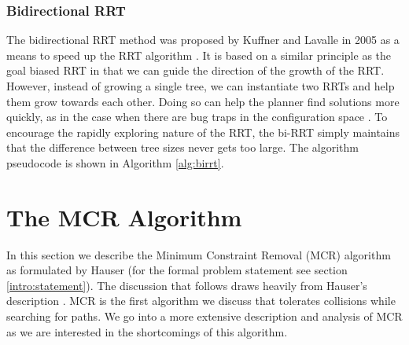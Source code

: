 \subsubsection{Bidirectional RRT} \label{planning:birrt}
The bidirectional RRT method was proposed by Kuffner and Lavalle in 2005 as a means to speed up the RRT algorithm \cite{lavalle:birrt}. It is based on a similar principle as the goal biased RRT in that we can guide the direction of the growth of the RRT. However, instead of growing a single tree, we can instantiate two RRTs and help them grow towards each other. Doing so can help the planner find solutions more quickly, as in the case when there are bug traps in the configuration space \cite{lavalle:planning}. To encourage the rapidly exploring nature of the RRT, the bi-RRT simply maintains that the difference between tree sizes never gets too large. The algorithm pseudocode is shown in Algorithm \ref{alg:birrt}.

{}

\section{The MCR Algorithm}
In this section we describe the Minimum Constraint Removal (MCR) algorithm as formulated by Hauser (for the formal problem statement see section \ref{intro:statement}). The discussion that follows draws heavily from Hauser's description \cite{hauser:mcr}. MCR is the first algorithm we discuss that tolerates collisions while searching for paths. We go into a more extensive description and analysis of MCR as we are interested in the shortcomings of this algorithm.

